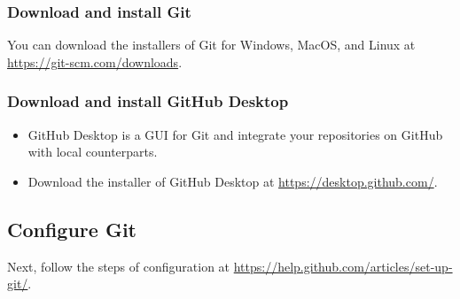 \documentclass[a4paper,11pt]{article}
\begin{document}
\subsubsection*{Download and install Git}
\label{sec:org1c4ba51}

You can download the installers of Git for Windows, MacOS, and Linux at
\url{https://git-scm.com/downloads}.

\subsubsection*{Download and install GitHub Desktop}
\label{sec:org180f644}

\begin{itemize}
\item GitHub Desktop is a GUI for Git and integrate your repositories on
GitHub with local counterparts.
\item Download the installer of GitHub Desktop at
\url{https://desktop.github.com/}.
\end{itemize}

\subsection{Configure Git}
\label{sec:org9c46bac}

Next, follow the steps of configuration at
\url{https://help.github.com/articles/set-up-git/}.
\end{document}
